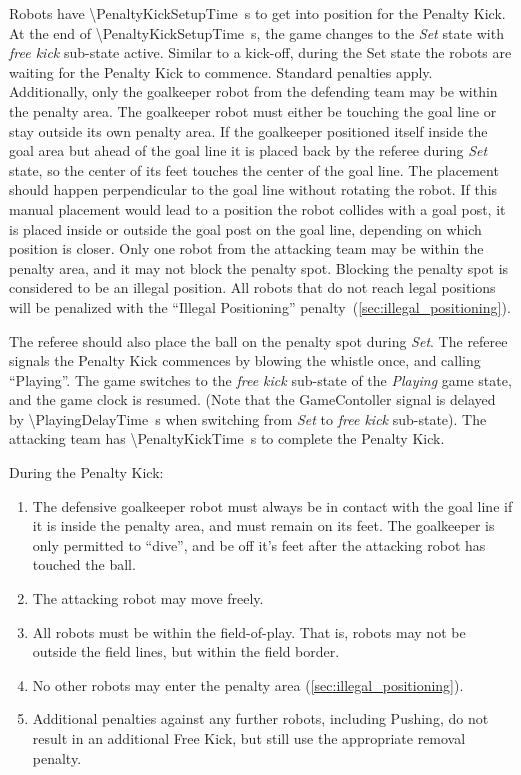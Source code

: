 Robots have \qty{\PenaltyKickSetupTime}{\second} to get into position for the Penalty Kick. At the end of \qty{\PenaltyKickSetupTime}{\second}, the game changes to the \textit{Set} state with \textit{free kick} sub-state active.
Similar to a kick-off, during the Set state the robots are waiting for the Penalty Kick to commence.
Standard penalties apply.
Additionally, only the goalkeeper robot from the defending team may be within the penalty area. The goalkeeper robot must either be touching the goal line or stay outside its own penalty area. If the goalkeeper positioned itself inside the goal area but ahead of the goal line it is placed back by the referee during \textit{Set} state, so the center of its feet touches the center of the goal line. The placement should happen perpendicular to the goal line without rotating the robot. If this manual placement would lead to a position the robot collides with a goal post, it is placed inside or outside the goal post on the goal line, depending on which position is closer.
Only one robot from the attacking team may be within the penalty area, and it may not block the penalty spot.
Blocking the penalty spot is considered to be an illegal position.
All robots that do not reach legal positions will be penalized with the ``Illegal Positioning'' penalty~(\cf \cref{sec:illegal_positioning}).

The referee should also place the ball on the penalty spot during \textit{Set}.
The referee signals the Penalty Kick commences by blowing the whistle once, and calling ``Playing''.
The game switches to the \textit{free kick} sub-state of the \textit{Playing} game state, and the game clock is resumed.
(Note that the GameContoller signal is delayed by \qty{\PlayingDelayTime}{\second} when switching from \textit{Set} to \textit{free kick} sub-state).
The attacking team has \qty{\PenaltyKickTime}{\second} to complete the Penalty Kick.

During the Penalty Kick:
\begin{enumerate}
    \item The defensive goalkeeper robot must always be in contact with the goal line if it is inside the penalty area, and must remain on its feet. The goalkeeper is only permitted to ``dive'', and be off it's feet after the attacking robot has touched the ball.
    \item The attacking robot may move freely.
    \item All robots must be within the field-of-play. That is, robots may not be outside the field lines, but within the field border.
    \item No other robots may enter the penalty area (\cf \cref{sec:illegal_positioning}).
    \item Additional penalties against any further robots, including Pushing, do not result in an additional Free
    Kick, but still use the appropriate removal penalty.
\end{enumerate}

